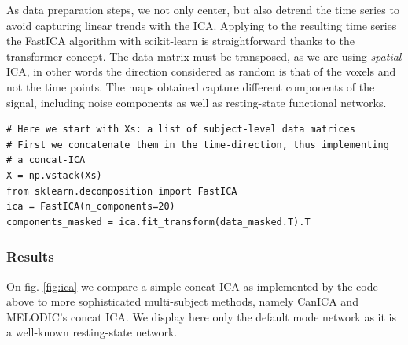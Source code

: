 \documentclass{frontiersSCNS} %
\begin{document}
As data preparation steps, we not only center, but also detrend the time
series to avoid capturing linear trends with the ICA. Applying to the
resulting time series the FastICA algorithm with scikit-learn is
straightforward thanks to the transformer concept. The data matrix must
be transposed, as we are using \emph{spatial} ICA, in other words the
direction considered as random is that of the voxels and not the time
points. The maps obtained capture different components of the signal,
including noise components as well as resting-state functional networks.


\begin{lstlisting}
# Here we start with Xs: a list of subject-level data matrices
# First we concatenate them in the time-direction, thus implementing
# a concat-ICA
X = np.vstack(Xs)
from sklearn.decomposition import FastICA
ica = FastICA(n_components=20)
components_masked = ica.fit_transform(data_masked.T).T
\end{lstlisting}

\subsubsection{Results}

On fig. \ref{fig:ica} we compare a simple concat ICA as implemented by
the code above to more sophisticated multi-subject methods, namely CanICA
and MELODIC's concat ICA. We display here only the default mode network
as it is a well-known resting-state network.
\end{document}

